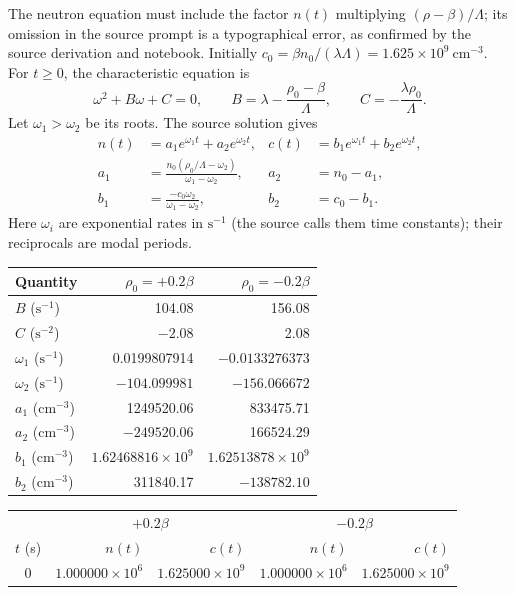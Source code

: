 \begin{adaptedsolution}
The neutron equation must include the factor $n(t)$ multiplying
$(\rho-\beta)/\Lambda$; its omission in the source prompt is a typographical
error, as confirmed by the source derivation and notebook.
Initially $c_0=\beta n_0/(\lambda\Lambda)=1.625\times10^9~\mathrm{cm^{-3}}$.
For $t\ge0$, the characteristic equation is
\[
\omega^2+B\omega+C=0,\qquad
B=\lambda-\frac{\rho_0-\beta}{\Lambda},\qquad
C=-\frac{\lambda\rho_0}{\Lambda}.
\]
Let $\omega_1>\omega_2$ be its roots. The source solution gives
\[
\begin{aligned}
n(t)&=a_1e^{\omega_1t}+a_2e^{\omega_2t},&
c(t)&=b_1e^{\omega_1t}+b_2e^{\omega_2t},\\
a_1&=\frac{n_0(\rho_0/\Lambda-\omega_2)}{\omega_1-\omega_2},&
a_2&=n_0-a_1,\\
b_1&=\frac{-c_0\omega_2}{\omega_1-\omega_2},&b_2&=c_0-b_1.
\end{aligned}
\]
Here $\omega_i$ are exponential rates in $\mathrm{s^{-1}}$ (the source
calls them time constants); their reciprocals are modal periods.
\begin{center}
\begin{tabular}{lrr}
\toprule
Quantity & $\rho_0=+0.2\beta$ & $\rho_0=-0.2\beta$\\
\midrule
$B$ ($\mathrm{s^{-1}}$) & 104.08 & 156.08\\
$C$ ($\mathrm{s^{-2}}$) & $-2.08$ & 2.08\\
$\omega_1$ ($\mathrm{s^{-1}}$) & 0.0199807914 & $-0.0133276373$\\
$\omega_2$ ($\mathrm{s^{-1}}$) & $-104.099981$ & $-156.066672$\\
$a_1$ ($\mathrm{cm^{-3}}$) & 1249520.06 & 833475.71\\
$a_2$ ($\mathrm{cm^{-3}}$) & $-249520.06$ & 166524.29\\
$b_1$ ($\mathrm{cm^{-3}}$) & $1.62468816\times10^9$ & $1.62513878\times10^9$\\
$b_2$ ($\mathrm{cm^{-3}}$) & 311840.17 & $-138782.10$\\
\bottomrule
\end{tabular}
\end{center}
\begin{center}
\begin{tabular}{crrrr}
\toprule
&\multicolumn{2}{c}{$+0.2\beta$}&\multicolumn{2}{c}{$-0.2\beta$}\\
$t$ (s)&$n(t)$&$c(t)$&$n(t)$&$c(t)$\\
\midrule
0 & $1.000000\times10^6$ & $1.625000\times10^9$ & $1.000000\times10^6$ & $1.625000\times10^9$\\

\end{tabular}
\end{center}
\end{adaptedsolution}
